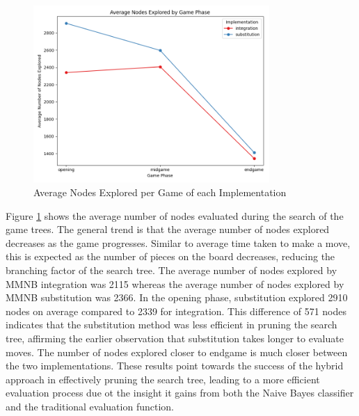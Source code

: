 \begin{figure}[H]
    \centering
    \includegraphics[width=0.8\textwidth]{images/plots/implementation/Implementation_vs_avg_nodes_explored_and_phase.png}
    \caption{Average Nodes Explored per Game of each Implementation}
    \label{fig: implementation_vs_avg_nodes_explored_and_phase}
\end{figure}


Figure \ref{fig: implementation_vs_avg_nodes_explored_and_phase} shows the average number of nodes evaluated during the search of the game trees. The general trend is that the average number of nodes explored decreases as the game progresses. Similar to average time taken to make a move, this is expected as the number of pieces on the board decreases, reducing the branching factor of the search tree. The average number of nodes explored by MMNB integration was 2115 whereas the average number of nodes explored by MMNB substitution was 2366. In the opening phase, substitution explored 2910 nodes on average compared to 2339 for integration. This difference of 571 nodes indicates that the substitution method was less efficient in pruning the search tree, affirming the earlier observation that substitution takes longer to evaluate moves. The number of nodes explored closer to endgame is much closer between the two implementations. These results point towards the success of the hybrid approach in effectively pruning the search tree, leading to a more efficient evaluation process due ot the insight it gains from both the Naive Bayes classifier and the traditional evaluation function. 

